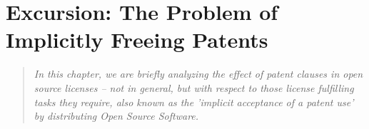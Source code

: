 %
%
%
%
%



\section{Excursion: The Problem of Implicitly Freeing Patents}
\footnotesize \begin{quote}\itshape In this chapter, we are briefly analyzing
the effect of patent clauses in open source licenses -- not in general, but with
respect to those license fulfilling tasks they require, also known as the
'implicit acceptance of a patent use' by distributing Open Source Software.
\end{quote}
\normalsize

